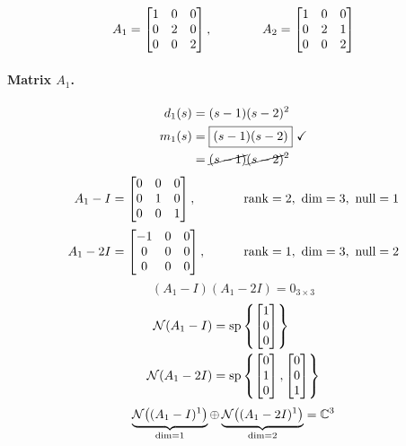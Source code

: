 \begin{example}
\[
A_1=\begin{bmatrix}1&0&0\\0&2&0\\0&0&2\end{bmatrix},\qquad\qquad A_2=\begin{bmatrix}1&0&0\\0&2&1\\0&0&2\end{bmatrix}
\]
\paragraph{Matrix $A_1$.}
\begin{align*}
d_1(s)&=(s-1)(s-2)^2\\
m_1(s)&=\boxed{(s-1)(s-2)}\ \checkmark\\
&=\cancel{(s-1)}\cancel{(s-2)}^2
\end{align*}
\begin{alignat*}{2}
A_1-I&=\begin{bmatrix}0&0&0\\0&1&0\\0&0&1\end{bmatrix}, &\qquad&\operatorname{rank}=2,\ \dim=3,\ \text{null}=1\\[2pt]
A_1-2I&=\begin{bmatrix}-1&0&0\\0&0&0\\0&0&0\end{bmatrix}, &&\operatorname{rank}=1,\ \dim=3,\ \text{null}=2
\end{alignat*}
\[ (A_1-I)(A_1-2I)=0_{3\times3} \]
\begin{align*}
\mathcal{N}(A_1-I)&=\operatorname{sp}\left\{\begin{bmatrix}1\\0\\0\end{bmatrix}\right\}\\
\mathcal{N}(A_1-2I)&=\operatorname{sp}\left\{\begin{bmatrix}0\\1\\0\end{bmatrix},\begin{bmatrix}0\\0\\1\end{bmatrix}\right\}
\end{align*}
\[
\underbrace{\mathcal{N}\big((A_1-I)^1\big)}_{\dim=1}\oplus\underbrace{\mathcal{N}\big((A_1-2I)^1\big)}_{\dim=2}=\mathbb{C}^3
\]


\end{example}

